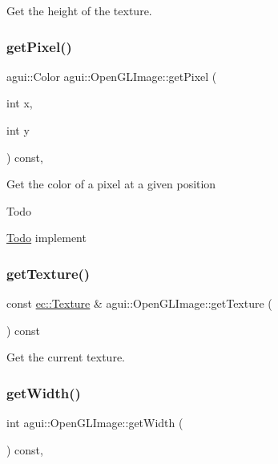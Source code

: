 Get the height of the texture. \mbox{\label{classagui_1_1_open_g_l_image_acea75a4849d6e14c608bc93be52e20c4}} 
\subsubsection{\texorpdfstring{get\+Pixel()}{getPixel()}}
{\footnotesize\ttfamily agui\+::\+Color agui\+::\+Open\+G\+L\+Image\+::get\+Pixel (\begin{DoxyParamCaption}\item[{int}]{x,  }\item[{int}]{y }\end{DoxyParamCaption}) const\hspace{0.3cm}{\ttfamily [override]}, {\ttfamily [virtual]}}

Get the color of a pixel at a given position \begin{DoxyRefDesc}{Todo}
\item[\mbox{\hyperlink{todo__todo000007}{Todo}}]implement \end{DoxyRefDesc}
\mbox{\label{classagui_1_1_open_g_l_image_a7a2025b69dd0e462c8b46d97532d3036}} 
\subsubsection{\texorpdfstring{get\+Texture()}{getTexture()}}
{\footnotesize\ttfamily const \mbox{\hyperlink{classec_1_1_texture}{ec\+::\+Texture}} \& agui\+::\+Open\+G\+L\+Image\+::get\+Texture (\begin{DoxyParamCaption}{ }\end{DoxyParamCaption}) const}

Get the current texture. \mbox{\label{classagui_1_1_open_g_l_image_a065277a19487d6e5e961ba39706f8084}} 
\subsubsection{\texorpdfstring{get\+Width()}{getWidth()}}
{\footnotesize\ttfamily int agui\+::\+Open\+G\+L\+Image\+::get\+Width (\begin{DoxyParamCaption}{ }\end{DoxyParamCaption}) const\hspace{0.3cm}{\ttfamily [override]}, {\ttfamily [virtual]}}

